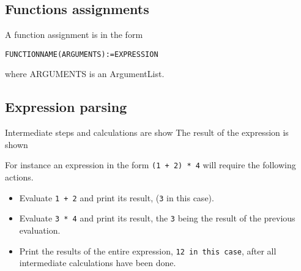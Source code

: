 \documentclass[11pt,a4paper]{article}
\begin{document}
\subsection{Functions assignments}
A function assignment is in the form

\texttt{FUNCTIONNAME(ARGUMENTS):=EXPRESSION}

where ARGUMENTS is an ArgumentList.
\subsection{Expression parsing}
Intermediate steps and calculations are show
The result of the expression is shown

For instance an expression in the form \texttt{(1 + 2) * 4} will require the following actions.

\begin{itemize}
\item Evaluate \texttt{1 + 2} and print its result, (\texttt{3} in this case).
\item Evaluate \texttt{3 * 4} and print its result, the \texttt{3} being the result of the previous evaluation.
\item Print the results of the entire expression, \texttt{12 in this case}, after all intermediate calculations have been done.
\end{itemize}
\end{document}

